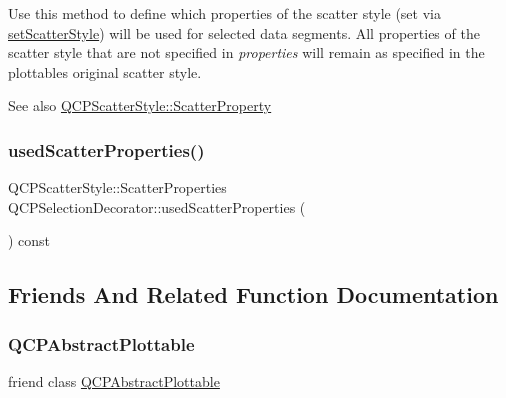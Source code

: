 Use this method to define which properties of the scatter style (set via \hyperlink{class_q_c_p_selection_decorator_ab403a613289714ff4fd4a0c0371ab116}{set\+Scatter\+Style}) will be used for selected data segments. All properties of the scatter style that are not specified in {\itshape properties} will remain as specified in the plottable\textquotesingle{}s original scatter style.

\begin{DoxySeeAlso}{See also}
\hyperlink{class_q_c_p_scatter_style_a8974f6a20f8f6eea7781f0e6af9deb46}{Q\+C\+P\+Scatter\+Style\+::\+Scatter\+Property} 
\end{DoxySeeAlso}
\mbox{\label{class_q_c_p_selection_decorator_ab2019bf31dde39f1ec028e3810dfc08b}} 
\subsubsection{\texorpdfstring{used\+Scatter\+Properties()}{usedScatterProperties()}}
{\footnotesize\ttfamily Q\+C\+P\+Scatter\+Style\+::\+Scatter\+Properties Q\+C\+P\+Selection\+Decorator\+::used\+Scatter\+Properties (\begin{DoxyParamCaption}{ }\end{DoxyParamCaption}) const\hspace{0.3cm}{\ttfamily [inline]}}



\subsection{Friends And Related Function Documentation}
\mbox{\label{class_q_c_p_selection_decorator_a53cf0e76aca814550c796fed79e345d6}} 
\subsubsection{\texorpdfstring{Q\+C\+P\+Abstract\+Plottable}{QCPAbstractPlottable}}
{\footnotesize\ttfamily friend class \hyperlink{class_q_c_p_abstract_plottable}{Q\+C\+P\+Abstract\+Plottable}\hspace{0.3cm}{\ttfamily [friend]}}



